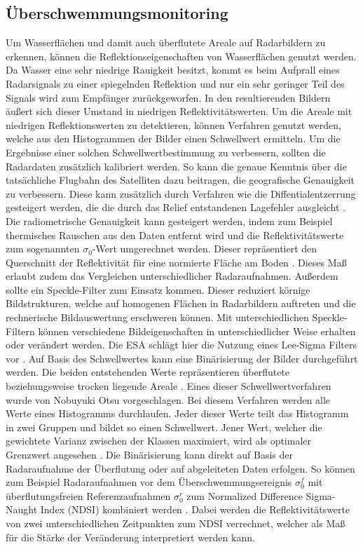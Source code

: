 \subsection{Überschwemmungsmonitoring}
Um Wasserflächen und damit auch überflutete Areale auf Radarbildern zu erkennen, können die Reflektionseigenschaften von Wasserflächen genutzt werden. Da Wasser eine 
sehr niedrige Rauigkeit besitzt, kommt es beim Aufprall eines Radarsignals zu einer spiegelnden Reflektion und nur ein sehr geringer Teil des Signals wird zum Empfänger 
zurückgeworfen. In den resultierenden Bildern äußert sich dieser Umstand in niedrigen Reflektivitätswerten. 
Um die Areale mit niedrigen Reflektionswerten zu detektieren, können Verfahren genutzt werden, welche aus den Histogrammen der Bilder einen Schwellwert ermitteln.
Um die Ergebnisse einer solchen Schwellwertbestimmung zu verbessern, sollten die Radardaten zusätzlich kalibriert werden. 
So kann die genaue Kenntnis über die tatsächliche Flugbahn des Satelliten dazu beitragen, die geografische Genauigkeit zu verbessern. Diese kann zusätzlich durch Verfahren 
wie die Diffentialentzerrung gesteigert werden, die die durch das Relief entstandenen Lagefehler ausgleicht \cite{einfuehrung_in_fernerkundung}.
Die radiometrische Genauigkeit kann gesteigert werden, indem zum Beispiel thermisches Rauschen aus den Daten entfernt wird und die Reflektivitätswerte zum 
sogenannten $\sigma_0$-Wert umgerechnet werden. Dieser repräsentiert den Querschnitt der Reflektivität für eine normierte Fläche am Boden 
\cite{radiometric_calibration_of_S1_level1_products}. Dieses Maß erlaubt zudem das Vergleichen unterschiedlicher Radaraufnahmen.  
Außerdem sollte ein Speckle-Filter zum Einsatz kommen. Dieser reduziert körnige Bildstrukturen, welche auf homogenen Flächen in Radarbildern auftreten und die 
rechnerische Bildauswertung erschweren können. Mit unterschiedlichen Speckle-Filtern können verschiedene Bildeigenschaften in unterschiedlicher Weise 
erhalten oder verändert werden. Die ESA schlägt hier die Nutzung eines Lee-Sigma Filters vor \cite{einfuehrung_in_fernerkundung,sentinel_1_flood_mapping_tutorial}.  
Auf Basis des Schwellwertes kann eine Binärisierung der Bilder durchgeführt werden. Die beiden entstehenden Werte repräsentieren überflutete beziehungsweise trocken liegende 
Areale \cite{sentinel_1_flood_mapping_tutorial}.
Eines dieser Schwellwertverfahren wurde von Nobuyuki Otsu vorgeschlagen. Bei diesem Verfahren werden alle Werte eines Histogramms durchlaufen.
Jeder dieser Werte teilt das Histogramm in zwei Gruppen und bildet so einen Schwellwert. Jener Wert, welcher die gewichtete Varianz zwischen der Klassen maximiert, wird
als optimaler Grenzwert angesehen \cite{thresholds_selection}. 
Die Binärisierung kann direkt auf Basis der Radaraufnahme der Überflutung oder auf abgeleiteten Daten erfolgen. So können zum Beispiel Radaraufnahmen vor dem Überschwemmungsereignis
$\sigma_0^f$ mit überflutungsfreien Referenzaufnahmen $\sigma_0^r$ zum Normalized Difference Sigma-Naught Index (NDSI) kombiniert werden \cite{flood_proxy_mapping_ndsi}.
Dabei werden die Reflektivitätswerte von zwei unterschiedlichen Zeitpunkten zum NDSI verrechnet, welcher als Maß für die Stärke der Veränderung interpretiert werden kann. 

